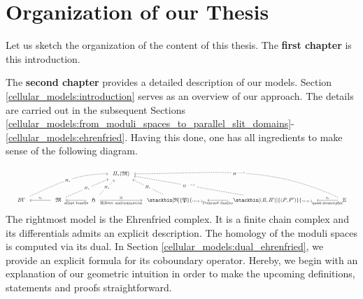 \section{Organization of our Thesis}

Let us sketch the organization of the content of this thesis. The {\bf first chapter} is this introduction.

The {\bf second chapter} provides a detailed description of our models.
Section \ref{cellular_models:introduction} serves as an overview of our approach.
The details are carried out in the subsequent Sections \ref{cellular_models:from_moduli_spaces_to_parallel_slit_domains}-\ref{cellular_models:ehrenfried}.
Having this done, one has all ingredients to make sense of the following diagram.
\[
    \resizebox{\linewidth}{!}{
        \begin{tikzcd}[row sep=7.5ex, scale=1.3, ampersand replacement=\&]
            \&\&\&\&\&H_\ast(\mathfrak M) \\
            B\Gamma \arrow[<-, shorten <=1ex, shorten >=1ex]{rr}{\simeq} \arrow[dashed, out=25, in=180, shorten <=1ex, shorten >=1ex]{rrrrru}[description]{H_\ast} \&\&
            \mathfrak M \arrow[<-, shorten <=1ex, shorten >=1ex]{rr}[swap]{\text{affine bundle}} \arrow[dashed, shorten <=1ex, shorten >=1ex]{rrru}[description]{H_\ast} \&\&
            \mathfrak H \arrow[shorten <=1ex, shorten >=1ex]{rr}{\cong}[swap]{\text{Hilbert uniformization}} \arrow[dashed, shorten <=1ex, shorten >=1ex]{ru}[description]{H_\ast} \&\&
            \stackbin[\mathfrak R]{\mathfrak P}{\scriptscriptstyle{resp.}} \arrow[<-, shorten <=1ex, shorten >=1ex]{rr}[swap]{\text{Poincaré duality}} \arrow[dashed, shorten <=1ex, shorten >=1ex]{lu}[description]{H_\ast} \&\&
            \stackbin[(R,R')]{(P,P')}{\scriptscriptstyle{resp.}} \arrow[<-, shorten <=1ex, shorten >=1ex]{rr}{\simeq}[swap]{\text{quasi-isomorphic}} \arrow[dashed, shorten <=1ex, shorten >=1ex]{lllu}[description]{H^{\ldots-\ast}} \&\&
            \E \arrow[dashed, out=155, in=0, shorten <=1ex, shorten >=1ex]{lllllu}[description]{H^{\ldots-\ast}}
        \end{tikzcd}
    }
\]
The rightmost model is the Ehrenfried complex.
It is a finite chain complex and its differentials admits an explicit description.
The homology of the moduli spaces is computed via its dual.
In Section \ref{cellular_models:dual_ehrenfried}, we provide an explicit formula for its coboundary operator.
Hereby, we begin with an explanation of our geometric intuition in order to make the upcoming definitions, statements and proofs straightforward.

